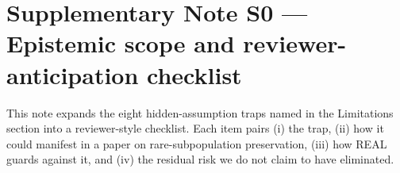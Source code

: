 
\section*{Supplementary Note S0 --- Epistemic scope and reviewer-anticipation checklist}

This note expands the eight hidden-assumption traps named in the Limitations section into a reviewer-style checklist. Each item pairs (i) the trap, (ii) how it could manifest in a paper on rare-subpopulation preservation, (iii) how REAL guards against it, and (iv) the residual risk we do not claim to have eliminated.

